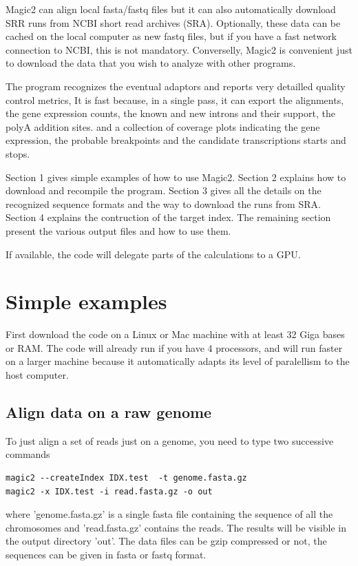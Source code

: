 \documentclass[11pt]{article}
\newcommand{\BL}{\begin{lstlisting}}
\begin{document}
Magic2 can align local fasta/fastq files
but it can also automatically download
SRR runs from NCBI short read archives (SRA). 
Optionally, these data can be cached on the local computer as new fastq files, but
if you have a fast network connection to NCBI, this
is not mandatory. Converselly, Magic2 is convenient just to download the data
that you wish to analyze with other programs.

The program recognizes the eventual adaptors and reports very detailled quality control metrics,
It is fast because, in a single pass,
it can export the alignments, the gene expression counts,
the known and new introns and their support, 
the polyA addition sites.
and a collection of coverage plots indicating the gene expression,
the probable breakpoints and the candidate transcriptions starts and stops.

Section 1 gives simple examples of how to use Magic2.
Section 2 explains how to download and recompile the program.
Section 3 gives all the details on the recognized sequence formats and the way
to download the runs from SRA.
Section 4 explains the contruction of the target index.
The remaining section present the various output files and how to use them.

If available, the code will delegate parts of the calculations to a GPU.

\section {Simple examples}

First download the code on a Linux or Mac machine with at least 32 Giga bases or RAM.
The code will already run if you have 4 processors, and will run faster
on a larger machine because it automatically adapts its level of paralellism to the
host computer.

\subsection {Align data on a raw genome}

To just align a set of reads just on a genome, you need to type
two successive commands

\BL
magic2 --createIndex IDX.test  -t genome.fasta.gz
magic2 -x IDX.test -i read.fasta.gz -o out 
\end{lstlisting}

where 'genome.fasta.gz' is a single fasta file containing the sequence of all the chromosomes
and 'read.fasta.gz' contains the reads. The results will be visible in the
output directory 'out'. The data files can be gzip compressed or not, the sequences
can be given in fasta or fastq format.
\end{document}
